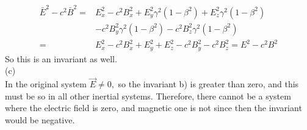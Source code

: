 \documentclass[UTF8]{ctexart}
\begin{document}
	$$\begin{aligned}
	\bar{E}^{2}-c^{2} \bar{B}^{2}=& E_{x}^{2}-c^{2} B_{x}^{2}+E_{y}^{2} \gamma^{2}\left(1-\beta^{2}\right)+E_{z}^{2} \gamma^{2}\left(1-\beta^{2}\right) \\
	&-c^{2} B_{y}^{2} \gamma^{2}\left(1-\beta^{2}\right)-c^{2} B_{z}^{2} \gamma^{2}\left(1-\beta^{2}\right) \\
	=& E_{x}^{2}-c^{2} B_{x}^{2}+E_{y}^{2}+E_{z}^{2}-c^{2} B_{y}^{2}-c^{2} B_{z}^{2}=E^{2}-c^{2} B^{2}
	\end{aligned}$$
	So this is an invariant as well.\\
	(c)\\
	In the original system $\vec{E} \neq 0,$ so the invariant b) is greater than zero, and this must be so in all other inertial systems. Therefore, there cannot be a system where the electric field is zero, and magnetic one is not since then the invariant would be negative.\\
	
\end{document}
